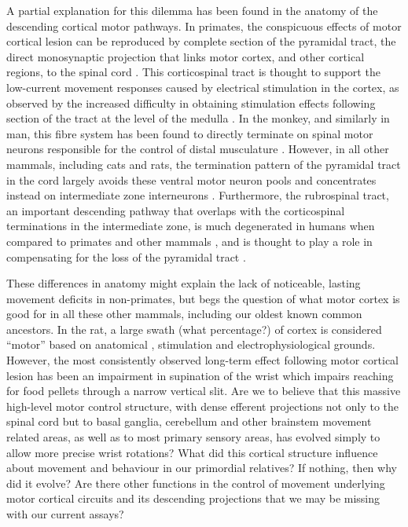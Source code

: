 A partial explanation for this dilemma has been found in the anatomy of the descending cortical motor pathways. In primates, the conspicuous effects of motor cortical lesion can be reproduced by complete section of the pyramidal tract, the direct monosynaptic projection that links motor cortex, and other cortical regions, to the spinal cord \cite{Tower1940,Lawrence1968}. This corticospinal tract is thought to support the low-current movement responses caused by electrical stimulation in the cortex, as observed by the increased difficulty in obtaining stimulation effects following section of the tract at the level of the medulla \cite{Woolsey1972}. In the monkey, and similarly in man, this fibre system has been found to directly terminate on spinal motor neurons responsible for the control of distal musculature \cite{Leyton1917,Bernhard1954}. However, in all other mammals, including cats and rats, the termination pattern of the pyramidal tract in the cord largely avoids these ventral motor neuron pools and concentrates instead on intermediate zone interneurons \cite{Kuypers1981,Yang2003}. Furthermore, the rubrospinal tract, an important descending pathway that overlaps with the corticospinal terminations in the intermediate zone, is much degenerated in humans when compared to primates and other mammals \cite{Square1982}, and is thought to play a role in compensating for the loss of the pyramidal tract \cite{Lawrence1968a}.

These differences in anatomy might explain the lack of noticeable, lasting movement deficits in non-primates, but begs the question of what motor cortex is good for in all these other mammals, including our oldest known common ancestors. In the rat, a large swath (what percentage?) of cortex is considered ``motor'' based on anatomical \cite{Donoghue1982}, stimulation \cite{Donoghue1982,Neafsey1986} and electrophysiological grounds. However, the most consistently observed long-term effect following motor cortical lesion has been an impairment in supination of the wrist which impairs reaching for food pellets through a narrow vertical slit. Are we to believe that this massive high-level motor control structure, with dense efferent projections not only to the spinal cord but to basal ganglia, cerebellum and other brainstem movement related areas, as well as to most primary sensory areas, has evolved simply to allow more precise wrist rotations? What did this cortical structure influence about movement and behaviour in our primordial relatives? If nothing, then why did it evolve? Are there other functions in the control of movement underlying motor cortical circuits and its descending projections that we may be missing with our current assays?

